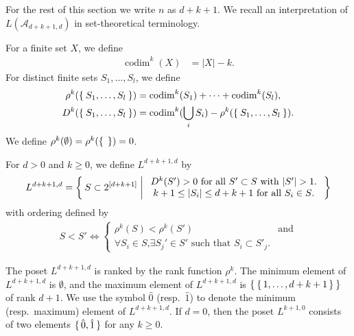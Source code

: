 \documentclass{wstmp}
\begin{document}
For the rest of this section we write $n$ as $d+k+1$.
We  recall an interpretation of 
$L({\mathcal{A}}_{d+k+1,d})$ in set-theoretical terminology\cite{athanasiadis2000}.
\begin{definition}
For a finite set $X$, we define
\begin{align*}
{\operatorname{codim}}^k (X) &={\left|{X}\right|}-k.
\end{align*}
For distinct finite sets $S_1,\ldots,S_l$, we define
\begin{align*}
\rho^k(\Set{S_1,\ldots,S_l})
&={\operatorname{codim}}^k (S_1)+\cdots+{\operatorname{codim}}^k (S_l), \\
D^k(\Set{S_1,\ldots,S_l})
&=
{\operatorname{codim}}^k (\bigcup_i S_i) -\rho^k(\Set{S_1,\ldots,S_l}).
\end{align*}
We define
$\rho^k(\emptyset)=\rho^k(\Set{})=0$.  
\end{definition}
\begin{definition}
\label{def:codim-new}
For $d>0$ and $k\geq 0$, we define $L^{d+k+1,d}$ by
\begin{align*}
L^{d+k+1,d}=
\Set{S \subset 2^{[d+k+1]} | 
\begin{array}{c}
\text{$D^k(S')>0$ for all $S'\subset S$ with ${\left|{S'}\right|}>1$.}\\
\text{$k+1 \leq {\left|{S_i}\right|}\leq d+k+1$ for all $S_i \in S$}.
\end{array}
}
\end{align*}
with ordering defined by
\begin{align*}
S<S' \iff 
\begin{cases}
\rho^k(S)<\rho^k(S')
& \text{and}\\
\text{$\forall S_i \in S$,
$\exists S_j' \in S'$ such that 
$S_i \subset S'_j$.}
\end{cases}
\end{align*}
\end{definition}

\begin{remark}
The poset $L^{d+k+1,d}$ 
is ranked by the rank function $\rho^k$.
The minimum element of $L^{d+k+1,d}$
is $\emptyset$,
and 
the maximum element of $L^{d+k+1,d}$ is
$\Set{\set{1,\ldots,d+k+1}}$
of rank $d+1$.
We use the symbol ${\hat{0}}$ (resp.\ ${\hat{1}}$) to denote 
the minimum (resp.\ maximum) element 
of $L^{d+k+1,d}$.
If $d=0$, then
the poset
$L^{k+1,0}$ consists of two elements $\set{{\hat{0}}, {\hat{1}}}$
for any $k\geq 0$.
\end{remark}
\end{document}
